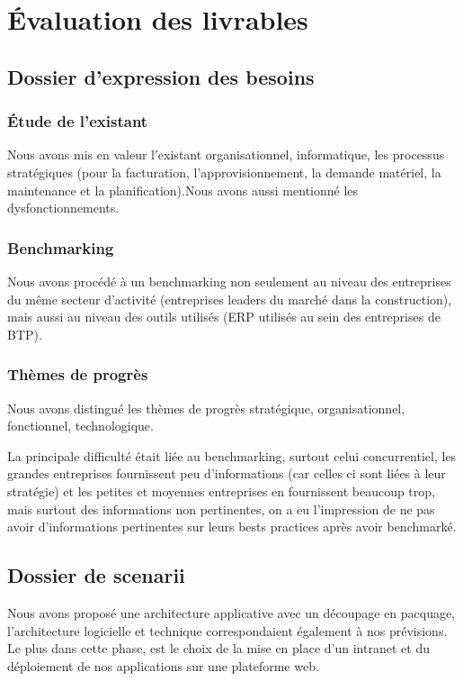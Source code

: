 \section{Évaluation des livrables}
       \subsection{Dossier d'expression des besoins}
              \subsubsection{Étude de l'existant}
Nous avons mis en valeur l'existant organisationnel, informatique, les processus stratégiques (pour la facturation, l'approvisionnement, la demande matériel, la maintenance et la planification).Nous avons aussi mentionné les dysfonctionnements.

              \subsubsection{Benchmarking}
Nous avons procédé à un benchmarking non seulement au niveau des entreprises du même secteur d'activité (entreprises leaders du marché dans la construction), mais aussi au niveau des outils utilisés (ERP utilisés au sein des entreprises de BTP).

              \subsubsection{Thèmes de progrès}
Nous avons distingué les thèmes de progrès stratégique, organisationnel, fonctionnel, technologique.

       La principale difficulté était liée au benchmarking, surtout celui concurrentiel, les grandes entreprises fournissent peu d'informations (car celles ci sont liées à leur stratégie) et les petites et moyennes entreprises en fournissent beaucoup trop, mais surtout des informations non pertinentes, on a eu l'impression de ne pas avoir d'informations pertinentes sur leurs bests practices après avoir benchmarké.

       \subsection{Dossier de scenarii}
Nous avons proposé une architecture applicative avec un découpage en pacquage, l'architecture logicielle et technique correspondaient également à nos prévisions. Le plus dans cette phase, est le choix de la mise en place d'un intranet et du déploiement de nos applications sur une plateforme web.

